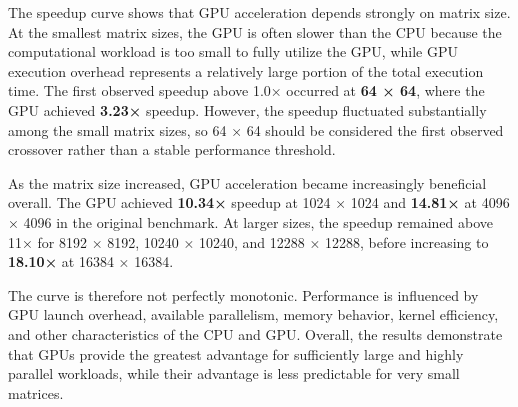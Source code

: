 \documentclass[11pt]{article}
\begin{document}
The speedup curve shows that GPU acceleration depends strongly on matrix
size. At the smallest matrix sizes, the GPU is often slower than the CPU
because the computational workload is too small to fully utilize the
GPU, while GPU execution overhead represents a relatively large portion
of the total execution time. The first observed speedup above 1.0×
occurred at \textbf{64 × 64}, where the GPU achieved \textbf{3.23×}
speedup. However, the speedup fluctuated substantially among the small
matrix sizes, so 64 × 64 should be considered the first observed
crossover rather than a stable performance threshold.

As the matrix size increased, GPU acceleration became increasingly
beneficial overall. The GPU achieved \textbf{10.34×} speedup at 1024 ×
1024 and \textbf{14.81×} at 4096 × 4096 in the original benchmark. At
larger sizes, the speedup remained above 11× for 8192 × 8192, 10240 ×
10240, and 12288 × 12288, before increasing to \textbf{18.10×} at 16384
× 16384.

The curve is therefore not perfectly monotonic. Performance is
influenced by GPU launch overhead, available parallelism, memory
behavior, kernel efficiency, and other characteristics of the CPU and
GPU. Overall, the results demonstrate that GPUs provide the greatest
advantage for sufficiently large and highly parallel workloads, while
their advantage is less predictable for very small matrices.


    
    
    
\end{document}
